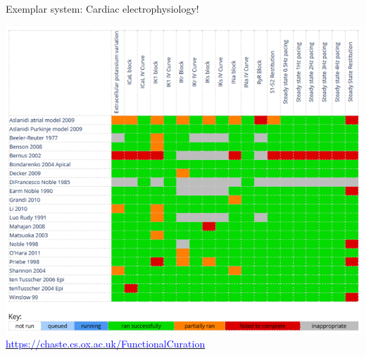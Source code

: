 \documentclass[t,xcolor={usenames,dvipsnames}]{beamer}
\newcommand{\myhref}[2]{\href{#1}{\textcolor{Blue}{#2}}}
\newcommand{\myurl}[1]{\myhref{#1}{#1}}
\begin{document}
\begin{frame}{Exemplar system: Cardiac electrophysiology!}
\begin{center}
\vspace{-.5cm}
\includegraphics[height=.8\textheight]{cardiac_fc_matrix}\\
\myurl{https://chaste.cs.ox.ac.uk/FunctionalCuration}
\end{center}
\end{frame}

\end{document}
